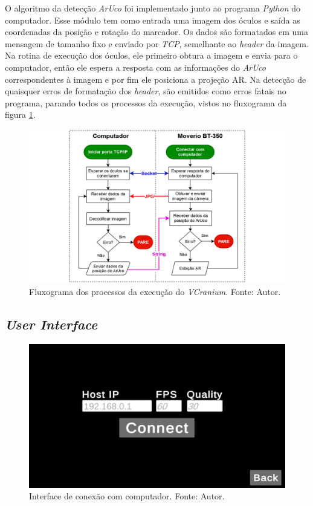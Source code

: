 O algoritmo da detecção \textit{ArUco} foi implementado junto ao programa \textit{Python} do computador. Esse módulo tem como entrada uma imagem dos óculos e saída as coordenadas da posição e rotação do marcador. Os dados são formatados em uma mensagem de tamanho fixo e enviado por \textit{TCP}, semelhante ao \textit{header} da imagem. Na rotina de execução dos óculos, ele primeiro obtura a imagem e envia para o computador, então ele espera a resposta com as informações do \textit{ArUco} correspondentes à imagem e por fim ele posiciona a projeção AR. Na detecção de quaisquer erros de formatação dos \textit{header}, são emitidos como erros fatais no programa, parando todos os processos da execução, vistos no fluxograma da figura \ref{fig:flowchart}.

\begin{figure}[ht]
    \centering
    \includegraphics[width=1\linewidth]{figuras/flowchart.png}
    \caption{Fluxograma dos processos da execução do \textit{VCranium}. Fonte: Autor.}
    \label{fig:flowchart}
\end{figure}

\newpage

\subsection{\textit{User Interface}}

\begin{figure}[ht]
    \centering
    \includegraphics[width=.65\linewidth]{figuras/vcranium_connect.png}
    \caption{Interface de conexão com computador. Fonte: Autor.}
    \label{fig:vcranium-connect}
\end{figure}




